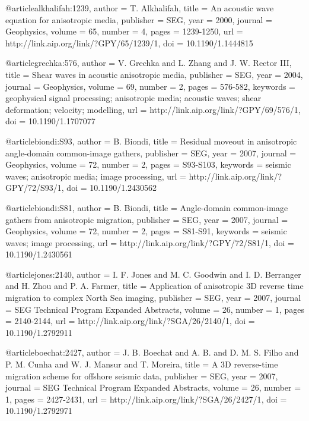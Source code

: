 @article{alkhalifah:1239,
  author =	 {T. Alkhalifah},
  title =	 {An acoustic wave equation for anisotropic media},
  publisher =	 {SEG},
  year =	 2000,
  journal =	 {Geophysics},
  volume =	 65,
  number =	 4,
  pages =	 {1239-1250},
  url =		 {http://link.aip.org/link/?GPY/65/1239/1},
  doi =		 {10.1190/1.1444815}
}

@article{grechka:576,
  author =	 {V. Grechka and L. Zhang and J.
                  W. Rector III},
  title =	 {Shear waves in acoustic anisotropic media},
  publisher =	 {SEG},
  year =	 2004,
  journal =	 {Geophysics},
  volume =	 69,
  number =	 2,
  pages =	 {576-582},
  keywords =	 {geophysical signal processing; anisotropic media;
                  acoustic waves; shear deformation; velocity;
                  modelling},
  url =		 {http://link.aip.org/link/?GPY/69/576/1},
  doi =		 {10.1190/1.1707077}
}

@article{biondi:S93,
  author =	 {B. Biondi},
  title =	 {Residual moveout in anisotropic angle-domain
                  common-image gathers},
  publisher =	 {SEG},
  year =	 2007,
  journal =	 {Geophysics},
  volume =	 72,
  number =	 2,
  pages =	 {S93-S103},
  keywords =	 {seismic waves; anisotropic media; image processing},
  url =		 {http://link.aip.org/link/?GPY/72/S93/1},
  doi =		 {10.1190/1.2430562}
}

@article{biondi:S81,
  author =	 {B. Biondi},
  title =	 {Angle-domain common-image gathers from anisotropic
                  migration},
  publisher =	 {SEG},
  year =	 2007,
  journal =	 {Geophysics},
  volume =	 72,
  number =	 2,
  pages =	 {S81-S91},
  keywords =	 {seismic waves; image processing},
  url =		 {http://link.aip.org/link/?GPY/72/S81/1},
  doi =		 {10.1190/1.2430561}
}

@article{jones:2140,
  author =	 {I. F. Jones and M. C. Goodwin and I. D. Berranger
                  and H. Zhou and P. A. Farmer},
  title =	 {Application of anisotropic {3D} reverse time
                  migration to complex {N}orth {S}ea imaging},
  publisher =	 {SEG},
  year =	 2007,
  journal =	 {SEG Technical Program Expanded Abstracts},
  volume =	 26,
  number =	 1,
  pages =	 {2140-2144},
  url =		 {http://link.aip.org/link/?SGA/26/2140/1},
  doi =		 {10.1190/1.2792911}
}

@article{boechat:2427,
  author =	 {J. B. Boechat and A. B.
                  and D. M. S. Filho and P. M. Cunha and
                  W. J. Mansur and T. Moreira},
  title =	 {A {3D} reverse-time migration scheme for offshore
                  seismic data},
  publisher =	 {SEG},
  year =	 2007,
  journal =	 {SEG Technical Program Expanded Abstracts},
  volume =	 26,
  number =	 1,
  pages =	 {2427-2431},
  url =		 {http://link.aip.org/link/?SGA/26/2427/1},
  doi =		 {10.1190/1.2792971}
}


